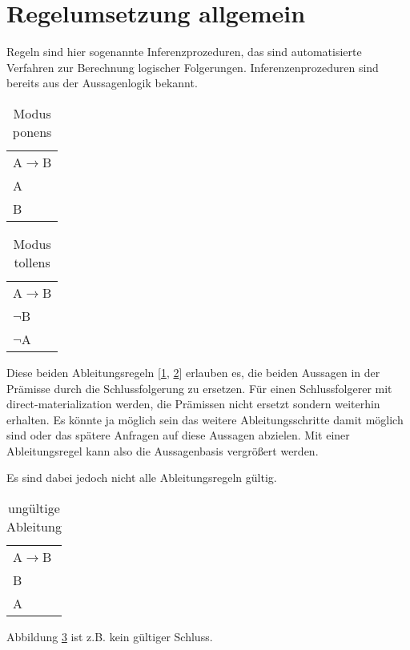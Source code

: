 \section{Regelumsetzung allgemein}
Regeln sind hier sogenannte Inferenzprozeduren, das sind automatisierte Verfahren zur Berechnung logischer Folgerungen. Inferenzenprozeduren sind bereits aus der Aussagenlogik bekannt.

\begin{table}[htb]
\begin{center}
	\begin{tabular}{l}
	A$\rightarrow$B \\
	A \\
	\hline
	B
	\end{tabular}
\end{center}
	\caption{Modus ponens}
	\label{table-modus-ponens}
\end{table}

\begin{table}[htb]
\begin{center}
	\begin{tabular}{l}
	A$\rightarrow$B \\
	$\neg$B \\
	\hline
	$\neg$A
	\end{tabular}
\end{center}
	\caption{Modus tollens}
	\label{table-modus-tollens}
\end{table}

Diese beiden Ableitungsregeln [\ref{table-modus-ponens}, \ref{table-modus-tollens}] erlauben es, die beiden Aussagen in der Prämisse durch die Schlussfolgerung zu ersetzen. Für einen Schlussfolgerer mit direct-materialization werden, die Prämissen nicht ersetzt sondern weiterhin erhalten. Es könnte ja möglich sein das weitere Ableitungsschritte damit möglich sind oder das spätere Anfragen auf diese Aussagen abzielen. Mit einer Ableitungsregel kann also die Aussagenbasis vergrößert werden.

Es sind dabei jedoch nicht alle Ableitungsregeln gültig.
\begin{table}[htb]
\begin{center}
	\begin{tabular}{l}
	A$\rightarrow$B \\
	B \\
	\hline
	A
	\end{tabular}
\end{center}
	\caption{ungültige Ableitung}
	\label{table-invalid-inferred}
\end{table}
Abbildung \ref{table-invalid-inferred} ist z.B. kein gültiger Schluss.

